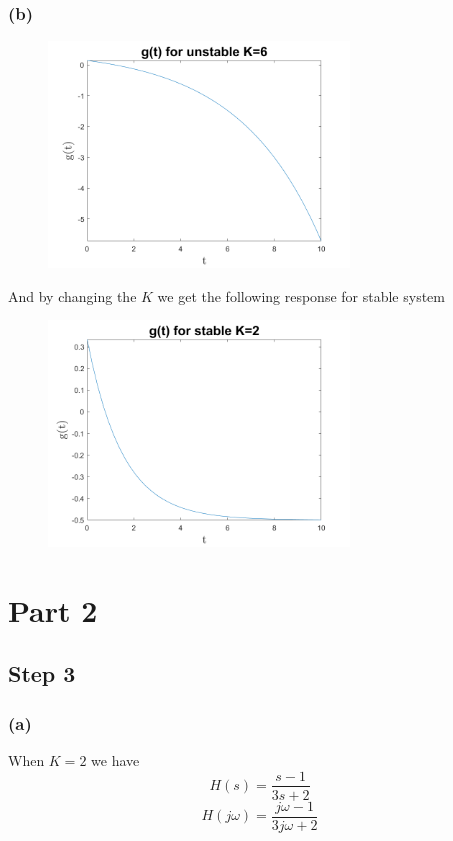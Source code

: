 \documentclass[12pt]{article}
\begin{document}
\subsubsection*{(b)}

\begin{center}
\begin{center}
\begin{figure}[h]\includegraphics[width=8cm]{fig6}
\end{figure}
\end{center}
\FloatBarrier
And by changing the $K$ we get the following response for stable system
\begin{figure}[h]\includegraphics[width=8cm]{fig5}
\end{figure}
\end{center}
\FloatBarrier
\section*{Part 2}
\subsection*{Step 3}
\subsubsection*{(a)}
When $K=2$ we have
$$H(s)=\frac{s-1}{3s+2}$$
$$H(j\omega)=\boxed{\frac{j\omega-1}{3j\omega+2}}$$
\end{document}
